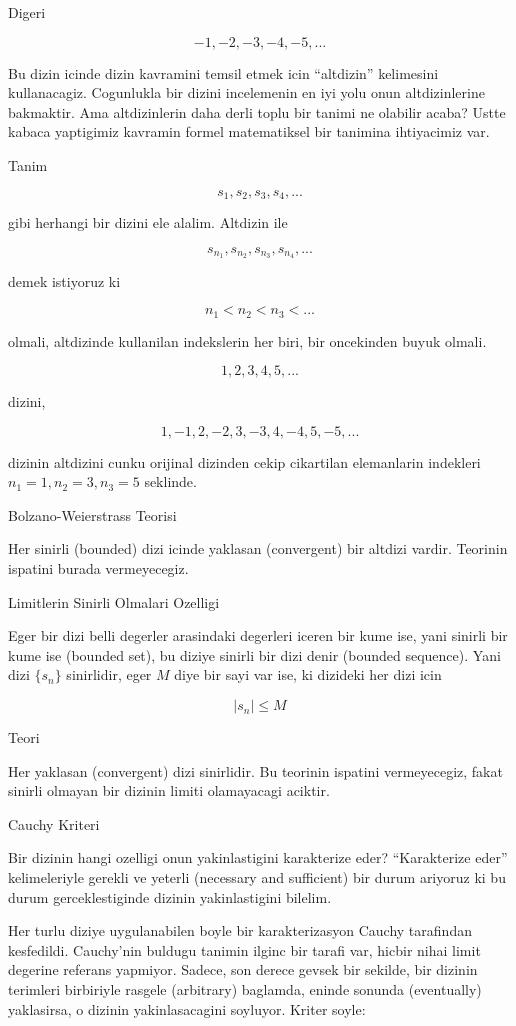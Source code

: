 \documentclass[12pt,fleqn]{article}
\begin{document}
Digeri 

\[ -1, -2, -3, -4, -5, ... \]

Bu dizin icinde dizin kavramini temsil etmek icin ``altdizin'' kelimesini
kullanacagiz. Cogunlukla bir dizini incelemenin en iyi yolu onun
altdizinlerine bakmaktir. Ama altdizinlerin daha derli toplu bir tanimi ne
olabilir acaba? Ustte kabaca yaptigimiz kavramin formel matematiksel bir
tanimina ihtiyacimiz var. 

Tanim

\[ s_1, s_2,s_3,s_4,...\]

gibi herhangi bir dizini ele alalim. Altdizin ile 

\[ s_{n_1},s_{n_2},s_{n_3},s_{n_4},... \]

demek istiyoruz ki

\[ n_1 < n_2 < n_3 < ... \]

olmali, altdizinde kullanilan indekslerin her biri, bir oncekinden buyuk
olmali. 

\[ 1, 2, 3, 4, 5, ... \]

dizini, 

\[ 1, -1, 2, -2, 3, -3, 4, -4, 5, -5, . . . \]

dizinin altdizini cunku orijinal dizinden cekip cikartilan elemanlarin
indekleri $n_1=1,n_2 = 3,n_3 = 5$ seklinde. 

Bolzano-Weierstrass Teorisi 

Her sinirli (bounded) dizi icinde yaklasan (convergent) bir altdizi
vardir. Teorinin ispatini burada vermeyecegiz. 

Limitlerin Sinirli Olmalari Ozelligi 

Eger bir dizi belli degerler arasindaki degerleri iceren bir kume ise, yani
sinirli bir kume ise (bounded set), bu diziye sinirli bir dizi denir
(bounded sequence). Yani dizi $\{s_n\}$ sinirlidir, eger $M$ diye bir sayi
var ise, ki dizideki her dizi icin 

\[ |s_n| \le M \]

Teori 

Her yaklasan (convergent) dizi sinirlidir. Bu teorinin ispatini
vermeyecegiz, fakat sinirli olmayan bir dizinin limiti olamayacagi
aciktir. 

Cauchy Kriteri 

Bir dizinin hangi ozelligi onun yakinlastigini karakterize eder?
``Karakterize eder'' kelimeleriyle gerekli ve yeterli (necessary and
sufficient) bir durum ariyoruz ki bu durum gerceklestiginde dizinin
yakinlastigini bilelim. 

Her turlu diziye uygulanabilen boyle bir karakterizasyon Cauchy tarafindan
kesfedildi. Cauchy'nin buldugu tanimin ilginc bir tarafi var, hicbir nihai
limit degerine referans yapmiyor. Sadece, son derece gevsek bir sekilde,
bir dizinin terimleri birbiriyle rasgele (arbitrary) baglamda, eninde
sonunda (eventually) yaklasirsa, o dizinin yakinlasacagini soyluyor. Kriter
soyle:
\end{document}
